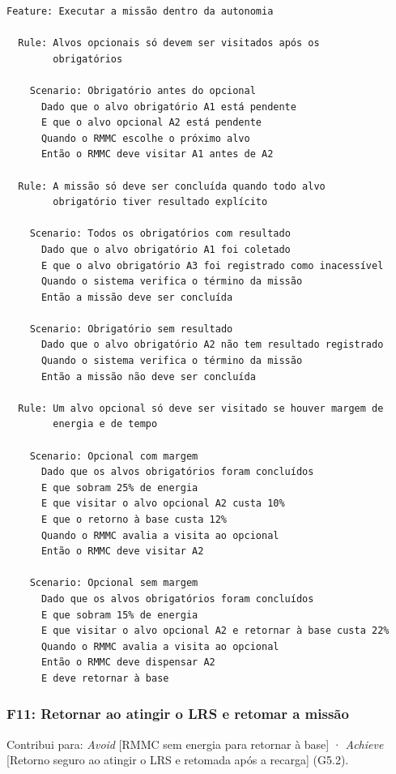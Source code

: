 \documentclass[a4paper, 12pt]{article}
\begin{document}
{\small
\begin{verbatim}
Feature: Executar a missão dentro da autonomia

  Rule: Alvos opcionais só devem ser visitados após os
        obrigatórios

    Scenario: Obrigatório antes do opcional
      Dado que o alvo obrigatório A1 está pendente
      E que o alvo opcional A2 está pendente
      Quando o RMMC escolhe o próximo alvo
      Então o RMMC deve visitar A1 antes de A2

  Rule: A missão só deve ser concluída quando todo alvo
        obrigatório tiver resultado explícito

    Scenario: Todos os obrigatórios com resultado
      Dado que o alvo obrigatório A1 foi coletado
      E que o alvo obrigatório A3 foi registrado como inacessível
      Quando o sistema verifica o término da missão
      Então a missão deve ser concluída

    Scenario: Obrigatório sem resultado
      Dado que o alvo obrigatório A2 não tem resultado registrado
      Quando o sistema verifica o término da missão
      Então a missão não deve ser concluída

  Rule: Um alvo opcional só deve ser visitado se houver margem de
        energia e de tempo

    Scenario: Opcional com margem
      Dado que os alvos obrigatórios foram concluídos
      E que sobram 25% de energia
      E que visitar o alvo opcional A2 custa 10%
      E que o retorno à base custa 12%
      Quando o RMMC avalia a visita ao opcional
      Então o RMMC deve visitar A2

    Scenario: Opcional sem margem
      Dado que os alvos obrigatórios foram concluídos
      E que sobram 15% de energia
      E que visitar o alvo opcional A2 e retornar à base custa 22%
      Quando o RMMC avalia a visita ao opcional
      Então o RMMC deve dispensar A2
      E deve retornar à base
\end{verbatim}
}

\Needspace{8cm}
\subsubsection{F11: Retornar ao atingir o LRS e retomar a missão}

Contribui para: \textit{Avoid} [RMMC sem energia para retornar à base] · \textit{Achieve} [Retorno seguro ao atingir o LRS e retomada após a recarga] (G5.2).
\end{document}
